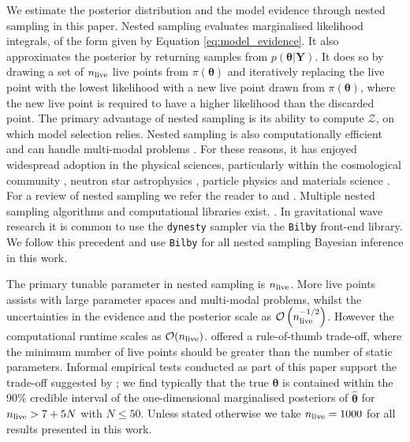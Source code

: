 \documentclass[fleqn,usenatbib,useAMS]{mnras}
\begin{document}
 We estimate the posterior distribution and the model evidence through nested sampling \citep{Skilling} in this paper. Nested sampling evaluates marginalised likelihood integrals, of the form given by Equation \eqref{eq:model_evidence}. It also approximates the posterior by returning samples from $p(\boldsymbol{\theta} | \boldsymbol{Y})$. It does so by drawing a set of $n_{\rm live}$ live points from $\pi(\boldsymbol{\theta})$ and iteratively replacing the live point with the lowest likelihood with a new live point drawn from $\pi(\boldsymbol{\theta})$, where the new live point is required to have a higher likelihood than the discarded point. The primary advantage of nested sampling is its ability to compute $\mathcal{Z}$, on which model selection relies. Nested sampling is also computationally efficient and can handle multi-modal problems \citep{Ashton2022}. For these reasons, it has enjoyed widespread adoption in the physical sciences, particularly within the cosmological community \citep{Mukherjee2006,Feroz2008,Handley2015}, neutron star astrophysics \citep{Myers2021MNRAS.502.3113M,Meyers2021,Melatos2023}, particle physics \citep{proceedings2019033014} and materials science \citep{2009arXiv0906materials}. For a review of nested sampling we refer the reader to \cite{Buchner2021} and \cite{Ashton2022}. Multiple nested sampling algorithms and computational libraries exist. \citep[e.g.][]{Feroz2008,Feroz2009,Handley2015,dynesty2020,UltraNest2021}. In gravitational wave research it is common to use the \texttt{dynesty} sampler \citep{dynesty2020} via the \texttt{Bilby} \citep{bilby.507.2037A} front-end library. We follow this precedent and use \texttt{Bilby} for all nested sampling Bayesian inference in this work. \newline 
 
The primary tunable parameter in nested sampling is $n_{\rm live}$. More live points assists with large parameter spaces and multi-modal problems, whilst the uncertainties in the evidence and the posterior scale as $\mathcal{O}\left(n_{\rm live}^{-1/2}\right)$. However the computational runtime scales as $\mathcal{O}(n_{\rm live})$. \cite{Ashton2022} offered a rule-of-thumb trade-off, where the minimum number of live points should be greater than the number of static parameters. Informal empirical tests conducted as part of this paper support the trade-off suggested by \cite{Ashton2022}; we find typically that the true ${\boldsymbol{\theta}}$ is contained within the 90\% credible interval of the one-dimensional marginalised posteriors of ${\boldsymbol{\hat{\theta}}}$ for $n_{\rm live} > 7 + 5N$ with $N \leq 50$. Unless stated otherwise we take $n_{\rm live} = 1000$ for all results presented in this work. \newline 
\end{document}

